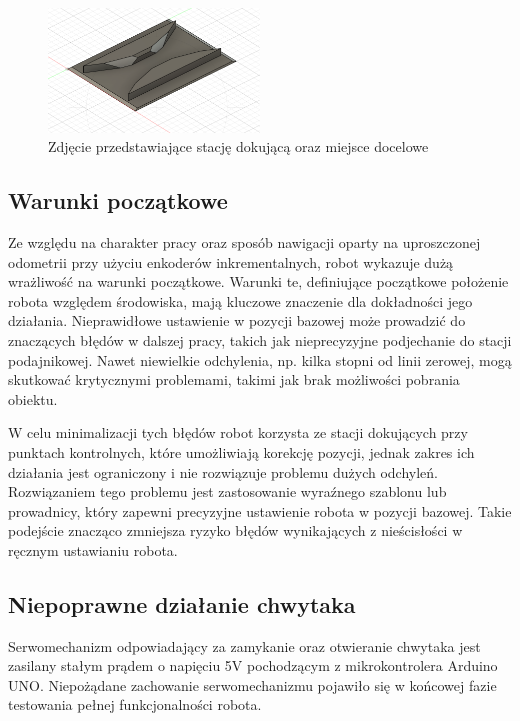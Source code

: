 \begin{figure}
    \centering
    \includegraphics[width=0.5\textwidth]{./graf/stacja-dokujaca.png}
    \caption{Zdjęcie przedstawiające stację dokującą oraz miejsce docelowe}
    \label{fig:stacja}
\end{figure}

\subsection{Warunki początkowe}

Ze względu na charakter pracy oraz sposób nawigacji oparty na uproszczonej odometrii przy użyciu enkoderów inkrementalnych, robot wykazuje dużą wrażliwość na warunki początkowe. Warunki te, definiujące początkowe położenie robota względem środowiska, mają kluczowe znaczenie dla dokładności jego działania. Nieprawidłowe ustawienie w pozycji bazowej może prowadzić do znaczących błędów w dalszej pracy, takich jak nieprecyzyjne podjechanie do stacji podajnikowej. Nawet niewielkie odchylenia, np. kilka stopni od linii zerowej, mogą skutkować krytycznymi problemami, takimi jak brak możliwości pobrania obiektu.

W celu minimalizacji tych błędów robot korzysta ze stacji dokujących przy punktach kontrolnych, które umożliwiają korekcję pozycji, jednak zakres ich działania jest ograniczony i nie rozwiązuje problemu dużych odchyleń. Rozwiązaniem tego problemu jest zastosowanie wyraźnego szablonu lub prowadnicy, który zapewni precyzyjne ustawienie robota w pozycji bazowej. Takie podejście znacząco zmniejsza ryzyko błędów wynikających z nieścisłości w ręcznym ustawianiu robota.

\subsection{Niepoprawne działanie chwytaka}

Serwomechanizm odpowiadający za zamykanie oraz otwieranie chwytaka jest zasilany stałym prądem o napięciu 5V pochodzącym z mikrokontrolera Arduino UNO. Niepożądane zachowanie serwomechanizmu pojawiło się w końcowej fazie testowania pełnej funkcjonalności robota. 

